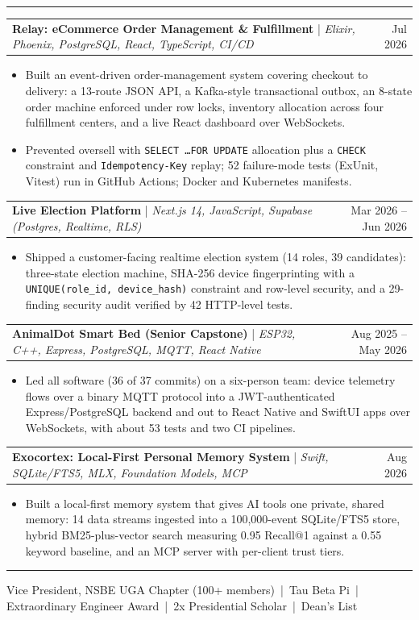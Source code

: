 \documentclass[letterpaper,10pt]{article}
\makeatletter
\newcommand{\sectiontitle}[1]{\vspace{4pt}{\textbf{\large #1}}\par\vspace{-6pt}\rule{\textwidth}{0.4pt}\par\vspace{1pt}}
\newcommand{\projectheading}[3]{\begin{tabularx}{\textwidth}{@{}X r@{}}\textbf{#1} \;|\; \textit{#2} & #3 \\ \end{tabularx}\par\vspace{1pt}}
\makeatother
\begin{document}
\sectiontitle{PROJECTS}
\projectheading{Relay: eCommerce Order Management \& Fulfillment}{Elixir, Phoenix, PostgreSQL, React, TypeScript, CI/CD}{Jul 2026}
\begin{itemize}
\item Built an event-driven order-management system covering checkout to delivery: a 13-route JSON API, a Kafka-style transactional outbox, an 8-state order machine enforced under row locks, inventory allocation across four fulfillment centers, and a live React dashboard over WebSockets.
\item Prevented oversell with \texttt{SELECT \ldots FOR UPDATE} allocation plus a \texttt{CHECK} constraint and \texttt{Idempotency-Key} replay; 52 failure-mode tests (ExUnit, Vitest) run in GitHub Actions; Docker and Kubernetes manifests.
\end{itemize}
\projectheading{Live Election Platform}{Next.js 14, JavaScript, Supabase (Postgres, Realtime, RLS)}{Mar 2026 -- Jun 2026}
\begin{itemize}
\item Shipped a customer-facing realtime election system (14 roles, 39 candidates): three-state election machine, SHA-256 device fingerprinting with a \texttt{UNIQUE(role\_id, device\_hash)} constraint and row-level security, and a 29-finding security audit verified by 42 HTTP-level tests.
\end{itemize}
\projectheading{AnimalDot Smart Bed (Senior Capstone)}{ESP32, C++, Express, PostgreSQL, MQTT, React Native}{Aug 2025 -- May 2026}
\begin{itemize}
\item Led all software (36 of 37 commits) on a six-person team: device telemetry flows over a binary MQTT protocol into a JWT-authenticated Express/PostgreSQL backend and out to React Native and SwiftUI apps over WebSockets, with about 53 tests and two CI pipelines.
\end{itemize}
\projectheading{Exocortex: Local-First Personal Memory System}{Swift, SQLite/FTS5, MLX, Foundation Models, MCP}{Aug 2026}
\begin{itemize}
\item Built a local-first memory system that gives AI tools one private, shared memory: 14 data streams ingested into a 100,000-event SQLite/FTS5 store, hybrid BM25-plus-vector search measuring 0.95 Recall@1 against a 0.55 keyword baseline, and an MCP server with per-client trust tiers.
\end{itemize}

\sectiontitle{LEADERSHIP \& HONORS}
{\small Vice President, NSBE UGA Chapter (100+ members) \,|\, Tau Beta Pi \,|\, Extraordinary Engineer Award \,|\, 2x Presidential Scholar \,|\, Dean's List}
\end{document}
